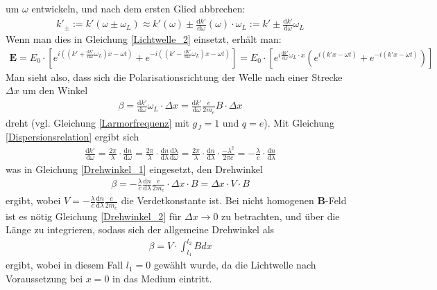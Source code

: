 \documentclass[12pt,a4paper]{article}
\begin{document}
um $\omega$ entwickeln, und nach dem ersten Glied abbrechen:
\begin{align*}
k'_{\pm} := k'(\omega \pm \omega_L) \approx k'(\omega) \pm \frac{\text{d} k'}{\text{d} \omega}(\omega)\cdot\omega_L := k' \pm \frac{\text{d}k'}{\text{d}\omega}\omega_L
\end{align*}
Wenn man dies in Gleichung \ref{Lichtwelle_2} einsetzt, erhält man:
\begin{align}
\textbf{E} = E_0\cdot[e^{i((k'+ \frac{\text{d} k'}{\text{d} \omega}\omega_L) x - \omega t)}+e^{-i((k' - \frac{\text{d} k'}{\text{d} \omega}\omega_L) x - \omega t)}] = E_0\cdot[e^{i\frac{\text{d} k'}{\text{d} \omega}\omega_L \cdot x}(e^{i(k' x - \omega t)}+e^{-i(k' x - \omega t)})]
\label{Lichtwelle_3}
\end{align}
Man sieht also, dass sich die Polarisationsrichtung der Welle nach einer Strecke $\Delta x$ um den Winkel
\begin{align}
\beta = \frac{\text{d} k'}{\text{d} \omega}\omega_L\cdot \Delta x = \frac{\text{d} k'}{\text{d} \omega}\frac{e}{2m_e}B\cdot \Delta x
\label{Drehwinkel_1}
\end{align}
dreht (vgl. Gleichung \ref{Larmorfrequenz} mit $g_J = 1$ und $ q = e $).
Mit Gleichung \ref{Dispersionsrelation} ergibt sich
\begin{align}
\frac{\text{d} k'}{\text{d} \omega} = \frac{2\pi}{\lambda}\cdot\frac{\text{d} n}{\text{d} \omega} = \frac{2\pi}{\lambda}\cdot\frac{\text{d} n}{\text{d} \lambda}\frac{\text{d} \lambda}{\text{d} \omega} = \frac{2\pi}{\lambda}\cdot \frac{\text{d} n}{\text{d} \lambda} \cdot \frac{-\lambda^2}{2\pi c} = -\frac{\lambda}{c} \cdot \frac{\text{d} n}{\text{d} \lambda}
\end{align}
was in Gleichung \ref{Drehwinkel_1} eingesetzt, den Drehwinkel
\begin{align}
\beta = -\frac{\lambda}{c} \frac{\text{d} n}{\text{d} \lambda}\frac{e}{2m_e}\cdot\Delta x\cdot B = \Delta x \cdot V \cdot B
\label{Drehwinkel_2}
\end{align}
ergibt, wobei $V =  -\frac{\lambda}{c} \frac{\text{d} n}{\text{d} \lambda}\frac{e}{2m_e}$ die Verdetkonstante ist.
Bei nicht homogenen \textbf{B}-Feld ist es nötig Gleichung \ref{Drehwinkel_2} für $\Delta x \rightarrow 0$ zu betrachten, und über die Länge zu integrieren, sodass sich der allgemeine Drehwinkel als
\begin{align}
\beta = V \cdot \int_{l_1}^{l_2} B dx
\end{align}
ergibt, wobei in diesem Fall $l_1 = 0$ gewählt wurde, da die Lichtwelle nach Voraussetzung bei $x=0$ in das Medium eintritt.\newpage
\end{document}
